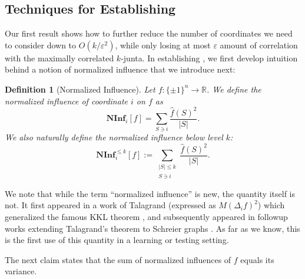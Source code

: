 \documentclass[10pt,a4paper]{article}
\theoremstyle{plain}
\newtheorem{definition}[theorem]{Definition}
\theoremstyle{remark}
\theoremstyle{plain}
\providecommand{\R}{}
\renewcommand{\R}{\mathbb{R}}
\newcommand\NormInf{{\mathbf{NInf}}}
\newcommand{\eps}{\varepsilon}
\renewcommand{\hat}{\widehat}
\newcommand{\pmone}{\{\pm 1\}}
\renewcommand{\epsilon}{\varepsilon}
\begin{document}
\subsection{Techniques for Establishing }
\label{subsection:improved-dmn-techniques}

Our first result shows how to further reduce the number of coordinates we need to consider down to $O(k/\eps^2)$, while only losing at most $\epsilon$ amount of correlation with the maximally correlated $k$-junta.
In establishing , we first develop intuition behind a notion of normalized influence that we introduce next:

\begin{definition}[Normalized Influence]
\label{definition:normalized-influence}
Let $f: \pmone^n \to \R$.
We define the normalized influence of coordinate $i$ on $f$ as
$$\NormInf_{i}[f] = \sum_{ S \ni i}\frac{\hat{f}(S)^2}{|S|}.$$
We also naturally define the normalized influence below level $k$: 
$$\NormInf_i^{\leq k}[f]:= \sum_{\substack{|S| \leq k \\ S \ni i}}\frac{\hat{f}(S)^2}{|S|}.$$
\end{definition}

We note that while the term ``normalized influence'' is new, the quantity itself is not. It first appeared in a work of Talagrand \cite{Talagrand-zero-one} (expressed as $M(\Delta_i f)^2$) which generalized the famous KKL theorem \cite{DBLP:conf/focs/KahnKL88, DBLP:journals/eccc/KelmanKKMS20}, and subsequently appeared in followup works extending Talagrand's theorem to Schreier graphs \cite{OK-schreier}. As far as we know, this is the first use of this quantity in a learning or testing setting.


The next claim states that the sum of normalized influences of $f$ equals its variance.
\end{document}
